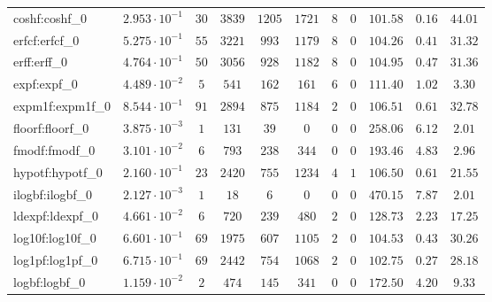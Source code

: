 \begin{tabular}{|l|c|c|c|c|c|c|c|c|c|c|}
coshf:coshf\_0               & $ 2.953 \cdot 10^{-1} $ & $ 30     $ & $ 3839  $ & $ 1205  $ & $ 1721  $ & $ 8   $ & $ 0 $ & $ 101.58      $ & $ 0.16    $ & $ 44.01   $ \\
erfcf:erfcf\_0               & $ 5.275 \cdot 10^{-1} $ & $ 55     $ & $ 3221  $ & $ 993   $ & $ 1179  $ & $ 8   $ & $ 0 $ & $ 104.26      $ & $ 0.41    $ & $ 31.32   $ \\
erff:erff\_0                 & $ 4.764 \cdot 10^{-1} $ & $ 50     $ & $ 3056  $ & $ 928   $ & $ 1182  $ & $ 8   $ & $ 0 $ & $ 104.95      $ & $ 0.47    $ & $ 31.36   $ \\
expf:expf\_0                 & $ 4.489 \cdot 10^{-2} $ & $ 5      $ & $ 541   $ & $ 162   $ & $ 161   $ & $ 6   $ & $ 0 $ & $ 111.40      $ & $ 1.02    $ & $ 3.30    $ \\
expm1f:expm1f\_0             & $ 8.544 \cdot 10^{-1} $ & $ 91     $ & $ 2894  $ & $ 875   $ & $ 1184  $ & $ 2   $ & $ 0 $ & $ 106.51      $ & $ 0.61    $ & $ 32.78   $ \\
floorf:floorf\_0             & $ 3.875 \cdot 10^{-3} $ & $ 1      $ & $ 131   $ & $ 39    $ & $ 0     $ & $ 0   $ & $ 0 $ & $ 258.06      $ & $ 6.12    $ & $ 2.01    $ \\
fmodf:fmodf\_0               & $ 3.101 \cdot 10^{-2} $ & $ 6      $ & $ 793   $ & $ 238   $ & $ 344   $ & $ 0   $ & $ 0 $ & $ 193.46      $ & $ 4.83    $ & $ 2.96    $ \\
hypotf:hypotf\_0             & $ 2.160 \cdot 10^{-1} $ & $ 23     $ & $ 2420  $ & $ 755   $ & $ 1234  $ & $ 4   $ & $ 1 $ & $ 106.50      $ & $ 0.61    $ & $ 21.55   $ \\
ilogbf:ilogbf\_0             & $ 2.127 \cdot 10^{-3} $ & $ 1      $ & $ 18    $ & $ 6     $ & $ 0     $ & $ 0   $ & $ 0 $ & $ 470.15      $ & $ 7.87    $ & $ 2.01    $ \\
ldexpf:ldexpf\_0             & $ 4.661 \cdot 10^{-2} $ & $ 6      $ & $ 720   $ & $ 239   $ & $ 480   $ & $ 2   $ & $ 0 $ & $ 128.73      $ & $ 2.23    $ & $ 17.25   $ \\
log10f:log10f\_0             & $ 6.601 \cdot 10^{-1} $ & $ 69     $ & $ 1975  $ & $ 607   $ & $ 1105  $ & $ 2   $ & $ 0 $ & $ 104.53      $ & $ 0.43    $ & $ 30.26   $ \\
log1pf:log1pf\_0             & $ 6.715 \cdot 10^{-1} $ & $ 69     $ & $ 2442  $ & $ 754   $ & $ 1068  $ & $ 2   $ & $ 0 $ & $ 102.75      $ & $ 0.27    $ & $ 28.18   $ \\
logbf:logbf\_0               & $ 1.159 \cdot 10^{-2} $ & $ 2      $ & $ 474   $ & $ 145   $ & $ 341   $ & $ 0   $ & $ 0 $ & $ 172.50      $ & $ 4.20    $ & $ 9.33    $ \\

\end{tabular}
